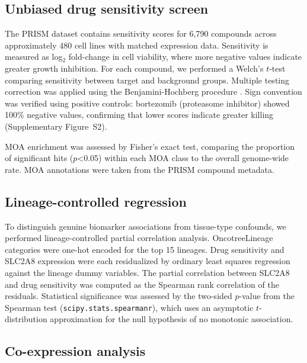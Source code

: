 \documentclass[12pt]{article}
\begin{document}
\subsection{Unbiased drug sensitivity screen}

The PRISM dataset contains sensitivity scores for 6,790 compounds
across approximately 480 cell lines with matched expression data.
Sensitivity is measured as log$_2$ fold-change in cell viability, where
more negative values indicate greater growth inhibition. For each
compound, we performed a Welch's $t$-test comparing sensitivity between
target and background groups. Multiple testing correction was applied
using the Benjamini-Hochberg procedure \citep{BenjaminiHochberg1995}.
Sign convention was verified using positive controls: bortezomib
(proteasome inhibitor) showed 100\% negative values, confirming that
lower scores indicate greater killing (Supplementary Figure~S2).

MOA enrichment was assessed by Fisher's exact test, comparing the
proportion of significant hits ($p$<0.05) within each MOA class to the
overall genome-wide rate. MOA annotations were taken from the PRISM
compound metadata.

\subsection{Lineage-controlled regression}

To distinguish genuine biomarker associations from tissue-type confounds,
we performed lineage-controlled partial correlation analysis.
OncotreeLineage categories were one-hot encoded for the top 15 lineages.
Drug sensitivity and SLC2A8 expression were each residualized by ordinary
least squares regression against the lineage dummy variables. The
partial correlation between SLC2A8 and drug sensitivity was computed as
the Spearman rank correlation of the residuals. Statistical significance
was assessed by the two-sided $p$-value from the Spearman test
(\texttt{scipy.stats.spearmanr}), which uses an asymptotic $t$-distribution
approximation for the null hypothesis of no monotonic association.

\subsection{Co-expression analysis}
\end{document}
